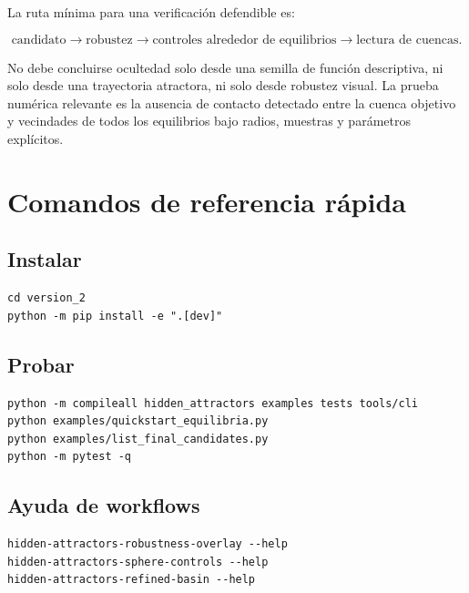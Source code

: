 \documentclass[11pt,letterpaper]{article}
\begin{document}
La ruta mínima para una verificación defendible es:

\begin{equation}
\text{candidato} \longrightarrow \text{robustez} \longrightarrow \text{controles alrededor de equilibrios} \longrightarrow \text{lectura de cuencas}.
\end{equation}

No debe concluirse ocultedad solo desde una semilla de función descriptiva, ni solo desde una trayectoria atractora, ni solo desde robustez visual. La prueba numérica relevante es la ausencia de contacto detectado entre la cuenca objetivo y vecindades de todos los equilibrios bajo radios, muestras y parámetros explícitos.

\appendix
\section{Comandos de referencia rápida}

\subsection*{Instalar}

\begin{lstlisting}[style=terminal]
cd version_2
python -m pip install -e ".[dev]"
\end{lstlisting}

\subsection*{Probar}

\begin{lstlisting}[style=terminal]
python -m compileall hidden_attractors examples tests tools/cli
python examples/quickstart_equilibria.py
python examples/list_final_candidates.py
python -m pytest -q
\end{lstlisting}

\subsection*{Ayuda de workflows}

\begin{lstlisting}[style=terminal]
hidden-attractors-robustness-overlay --help
hidden-attractors-sphere-controls --help
hidden-attractors-refined-basin --help
\end{lstlisting}
\end{document}
